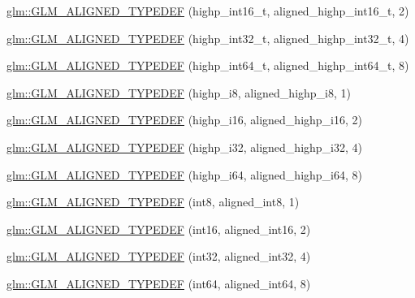 \begin{DoxyCompactItemize}
\item 
\hyperlink{group__gtx__type__aligned_ga968f30319ebeaca9ebcd3a25a8e139fb}{glm\-::\-G\-L\-M\-\_\-\-A\-L\-I\-G\-N\-E\-D\-\_\-\-T\-Y\-P\-E\-D\-E\-F} (highp\-\_\-int16\-\_\-t, aligned\-\_\-highp\-\_\-int16\-\_\-t, 2)
\item 
\hyperlink{group__gtx__type__aligned_gaae773c28e6390c6aa76f5b678b7098a3}{glm\-::\-G\-L\-M\-\_\-\-A\-L\-I\-G\-N\-E\-D\-\_\-\-T\-Y\-P\-E\-D\-E\-F} (highp\-\_\-int32\-\_\-t, aligned\-\_\-highp\-\_\-int32\-\_\-t, 4)
\item 
\hyperlink{group__gtx__type__aligned_ga790cfff1ca39d0ed696ffed980809311}{glm\-::\-G\-L\-M\-\_\-\-A\-L\-I\-G\-N\-E\-D\-\_\-\-T\-Y\-P\-E\-D\-E\-F} (highp\-\_\-int64\-\_\-t, aligned\-\_\-highp\-\_\-int64\-\_\-t, 8)
\item 
\hyperlink{group__gtx__type__aligned_ga8265b91eb23c120a9b0c3e381bc37b96}{glm\-::\-G\-L\-M\-\_\-\-A\-L\-I\-G\-N\-E\-D\-\_\-\-T\-Y\-P\-E\-D\-E\-F} (highp\-\_\-i8, aligned\-\_\-highp\-\_\-i8, 1)
\item 
\hyperlink{group__gtx__type__aligned_gae6d384de17588d8edb894fbe06e0d410}{glm\-::\-G\-L\-M\-\_\-\-A\-L\-I\-G\-N\-E\-D\-\_\-\-T\-Y\-P\-E\-D\-E\-F} (highp\-\_\-i16, aligned\-\_\-highp\-\_\-i16, 2)
\item 
\hyperlink{group__gtx__type__aligned_ga9c8172b745ee03fc5b2b91c350c2922f}{glm\-::\-G\-L\-M\-\_\-\-A\-L\-I\-G\-N\-E\-D\-\_\-\-T\-Y\-P\-E\-D\-E\-F} (highp\-\_\-i32, aligned\-\_\-highp\-\_\-i32, 4)
\item 
\hyperlink{group__gtx__type__aligned_ga77e0dff12aa4020ddc3f8cabbea7b2e6}{glm\-::\-G\-L\-M\-\_\-\-A\-L\-I\-G\-N\-E\-D\-\_\-\-T\-Y\-P\-E\-D\-E\-F} (highp\-\_\-i64, aligned\-\_\-highp\-\_\-i64, 8)
\item 
\hyperlink{group__gtx__type__aligned_gabd82b9faa9d4d618dbbe0fc8a1efee63}{glm\-::\-G\-L\-M\-\_\-\-A\-L\-I\-G\-N\-E\-D\-\_\-\-T\-Y\-P\-E\-D\-E\-F} (int8, aligned\-\_\-int8, 1)
\item 
\hyperlink{group__gtx__type__aligned_ga285649744560be21000cfd81bbb5d507}{glm\-::\-G\-L\-M\-\_\-\-A\-L\-I\-G\-N\-E\-D\-\_\-\-T\-Y\-P\-E\-D\-E\-F} (int16, aligned\-\_\-int16, 2)
\item 
\hyperlink{group__gtx__type__aligned_ga07732da630b2deda428ce95c0ecaf3ff}{glm\-::\-G\-L\-M\-\_\-\-A\-L\-I\-G\-N\-E\-D\-\_\-\-T\-Y\-P\-E\-D\-E\-F} (int32, aligned\-\_\-int32, 4)
\item 
\hyperlink{group__gtx__type__aligned_ga1a8da2a8c51f69c07a2e7f473aa420f4}{glm\-::\-G\-L\-M\-\_\-\-A\-L\-I\-G\-N\-E\-D\-\_\-\-T\-Y\-P\-E\-D\-E\-F} (int64, aligned\-\_\-int64, 8)

\end{DoxyCompactItemize}
